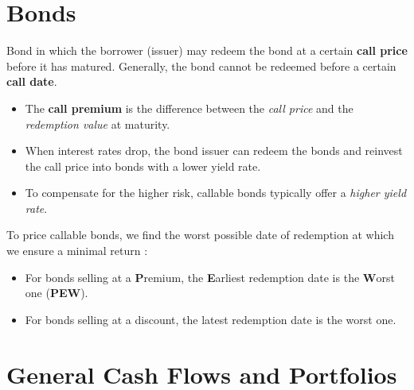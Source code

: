 \documentclass[10pt, french]{article}
\def\SectionColor{cobalt}
\begin{document}
\begin{multicols*}{2}
\section{Bonds}
\begin{definitionNOHFILL}
Bond in which the borrower (issuer) may redeem the bond at a certain \textbf{call price} before it has matured. Generally, the bond cannot be redeemed before a certain \textbf{call date}. 

\begin{itemize}
	\item	The \textbf{call premium} is the difference between the \textit{call price} and the \textit{redemption value} at maturity.
\end{itemize}

\begin{rappel_enhanced}[Context]
\begin{itemize}
	\item	When interest rates drop, the bond issuer can redeem the bonds and reinvest the call price into bonds with a lower yield rate.
	\item	To compensate for the higher risk, callable bonds typically offer a \textit{higher yield rate}.
\end{itemize}
\end{rappel_enhanced}

To price callable bonds, we find the worst possible date of redemption at which we ensure a minimal return :
\begin{itemize}
		\item	For bonds selling at a \textbf{P}remium, the \textbf{E}arliest redemption date is the \textbf{W}orst one (\textbf{PEW}).
		\item	For bonds selling at a discount, the latest redemption date is the worst one.
\end{itemize}
\end{definitionNOHFILL}



\newpage
\def\SectionColor{teal!80!white}
\section{General Cash Flows and Portfolios}

\end{multicols*}
\end{document}
